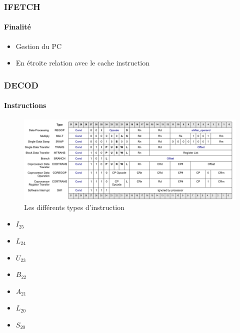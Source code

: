 \documentclass{beamer}
\begin{document}
	\begin{frame}
		\frametitle{IFETCH}
		\framesubtitle{Finalité}
		\begin{itemize}
			\item Gestion du PC
			\item En étroite relation avec le cache instruction
		\end{itemize}

	\end{frame}

	\begin{frame}
		\frametitle{DECOD}
		\framesubtitle{Instructions}
		\begin{figure}
			\includegraphics[width=\textwidth]{instructions}
			\caption{Les différents types d'instruction}
		\end{figure}
		\begin{itemize}
			\item $I_{25}$ \checkmark
			\item $L_{24}$ \checkmark
			\item $U_{23}$
			\item $B_{22}$ \checkmark
			\item $A_{21}$ \checkmark
			\item $L_{20}$ \checkmark
			\item $S_{20}$ \checkmark
		\end{itemize}
	\end{frame}
	
\end{document}
